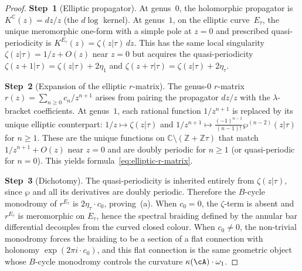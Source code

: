 \begin{proof}
\textbf{Step~1} (Elliptic propagator).
At genus~$0$, the holomorphic propagator is
$K^{\mathbb{C}}(z)=dz/z$ (the $d\log$ kernel). At
genus~$1$, on the elliptic curve~$E_\tau$, the unique meromorphic
one-form with a simple pole at $z=0$ and prescribed quasi-periodicity
is $K^{E_\tau}(z)=\zeta(z|\tau)\,dz$. This has the same local
singularity $\zeta(z|\tau)=1/z+O(z)$ near $z=0$ but acquires
the quasi-periodicity
$\zeta(z+1|\tau)=\zeta(z|\tau)+2\eta_1$ and
$\zeta(z+\tau|\tau)=\zeta(z|\tau)+2\eta_\tau$.

\textbf{Step~2} (Expansion of the elliptic $r$-matrix).
The genus-$0$ $r$-matrix $r(z)=\sum_{n\ge 0}c_n/z^{n+1}$
arises from pairing the propagator $dz/z$ with the
$\lambda$-bracket coefficients. At genus~$1$, each
rational function $1/z^{n+1}$ is replaced by its unique
elliptic counterpart: $1/z\mapsto\zeta(z|\tau)$ and
$1/z^{n+1}\mapsto\frac{(-1)^{n-1}}{(n-1)!}\wp^{(n-2)}(z|\tau)$
for $n\ge 1$. These are the unique functions on
$\mathbb{C}\setminus(\mathbb{Z}+\mathbb{Z}\tau)$ that
match $1/z^{n+1}+O(z)$ near $z=0$ and are doubly periodic
for $n\ge 1$ (or quasi-periodic for $n=0$). This yields
formula~\eqref{eq:elliptic-r-matrix}.

\textbf{Step~3} (Dichotomy).
The quasi-periodicity is inherited entirely from $\zeta(z|\tau)$,
since $\wp$ and all its derivatives are doubly periodic.
Therefore the $B$-cycle monodromy of $r^{E_\tau}$ is
$2\eta_\tau\cdot c_0$, proving~(a). When $c_0=0$, the
$\zeta$-term is absent and $r^{E_\tau}$ is meromorphic on
$E_\tau$, hence the spectral braiding defined by the annular bar
differential decouples from the curved closed colour. When
$c_0\ne 0$, the non-trivial monodromy
forces the braiding to be a section of a flat connection with
holonomy $\exp(2\pi i\cdot c_0)$, and this flat connection
is the same geometric object whose $B$-cycle monodromy
controls the curvature $\kappa(\cA)\cdot\omega_1$.
\end{proof}

